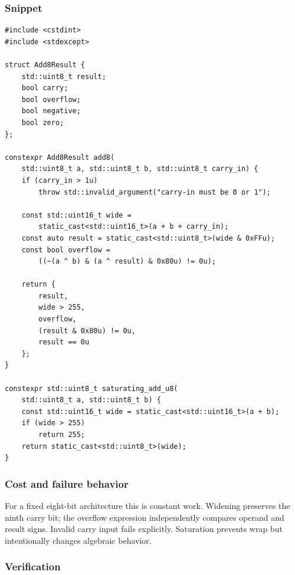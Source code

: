 \subsubsection{Snippet}\label{appendix-4e2236f53445-snippet-1}

\hypertarget{appendix-4e2236f53445-snippet-1}{}

\begin{verbatim}
#include <cstdint>
#include <stdexcept>

struct Add8Result {
    std::uint8_t result;
    bool carry;
    bool overflow;
    bool negative;
    bool zero;
};

constexpr Add8Result add8(
    std::uint8_t a, std::uint8_t b, std::uint8_t carry_in) {
    if (carry_in > 1u)
        throw std::invalid_argument("carry-in must be 0 or 1");

    const std::uint16_t wide =
        static_cast<std::uint16_t>(a + b + carry_in);
    const auto result = static_cast<std::uint8_t>(wide & 0xFFu);
    const bool overflow =
        ((~(a ^ b) & (a ^ result) & 0x80u) != 0u);

    return {
        result,
        wide > 255,
        overflow,
        (result & 0x80u) != 0u,
        result == 0u
    };
}

constexpr std::uint8_t saturating_add_u8(
    std::uint8_t a, std::uint8_t b) {
    const std::uint16_t wide = static_cast<std::uint16_t>(a + b);
    if (wide > 255)
        return 255;
    return static_cast<std::uint8_t>(wide);
}
\end{verbatim}

\subsubsection{Cost and failure behavior}\label{appendix-4e2236f53445-cost-and-failure-behavior-1}

\hypertarget{appendix-4e2236f53445-cost-and-failure-behavior-1}{}

For a fixed eight-bit architecture this is constant work. Widening preserves the ninth carry bit; the overflow expression independently compares operand and result signs. Invalid carry input fails explicitly. Saturation prevents wrap but intentionally changes algebraic behavior.

\subsubsection{Verification}\label{appendix-4e2236f53445-verification-1}

